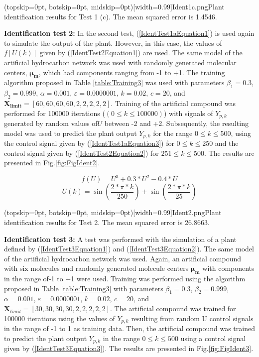 \documentclass{ieeeaccess}
\begin{document}
\Figure[ht!](topskip=0pt, botskip=0pt, midskip=0pt)[width=0.99\columnwidth]{Ident1c.png}{Plant identification results for Test 1 (c). The mean squared error is 1.4546\label{fig:FigIdent1c}.}

\textbf{Identification test 2:} In the second test, (\ref{IdentTest1aEquation1}) is used again to simulate the output of the plant. However, in this case, the values of \(f[U(k)]\) given by (\ref{IdentTest2Equation1})\cite{narendra_identification_1990} are used. The same model of the artificial hydrocarbon network was used with randomly generated molecular centers, \(\mathbf{\mu_m}\), which had components ranging from -1 to +1. The training algorithm proposed in Table \ref{table:Training3} was used with parameters \(\beta_1=0.3\), \(\beta_2=0.999\), \(\alpha=0.001\), \(\varepsilon=0.0000001\), \(k=0.02\), \(c=20\), and \(\mathbf{X_{limit}}=[60,60,60,60,2,2,2,2,2]\). Training of the artificial compound was performed for 100000 iterations (\((0\le k\le100000)\)) with signals of \(Y_{p,k}\) generated by random values of\(U\) between -2 and +2. Subsequently, the resulting model was used to predict the plant output \(Y_{p,k}\) for the range \(0\le k\le500\), using the control signal given by (\ref{IdentTest1aEquation3}) for \(0\le k\le250\) and the control signal given by (\ref{IdentTest2Equation2}) for \(251\le k\le500\). The results are presented in Fig.\ref{fig:FigIdent2}.

\begin{equation}\label{IdentTest2Equation1}
f\left(U\right)=U^3+0.3\ast U^2-0.4\ast U
\end{equation}
\begin{equation}\label{IdentTest2Equation2}
U\left(k\right)=\sin{\left(\frac{2\ast\pi\ast k}{250}\right)}+\sin{\left(\frac{2\ast\pi\ast k}{25}\right)}
\end{equation}

\Figure[ht!](topskip=0pt, botskip=0pt, midskip=0pt)[width=0.99\columnwidth]{Ident2.png}{Plant identification results for Test 2. The mean squared error is 26.8663\label{fig:FigIdent2}.}

\textbf{Identification test 3:} A test was performed with the simulation of a plant defined by (\ref{IdentTest3Equation1}) and (\ref{IdentTest3Equation2})\cite{narendra_identification_1990}. The
same model of the artificial hydrocarbon network was used. Again, an artificial compound with six molecules and randomly generated molecule centers \(\mathbf{\mu_m}\) with components in the range of-1 to +1 were used. Training was performed using the algorithm proposed in Table \ref{table:Training3} with parameters \(\beta_1=0.3\), \(\beta_2=0.999\), \(\alpha=0.001\), \(\varepsilon=0.0000001\), \(k=0.02\), \(c=20\), and \(\mathbf{X}_{limit}=[30,30,30,30,2,2,2,2,2]\). The artificial compound was trained for 100000 iterations using the values of \(Y_{p,k}\) resulting from random U control signals in the range of -1 to 1 as training data. Then, the artificial compound was trained to predict the plant output \(Y_{p,k}\) in the range \(0\le k\le500\) using a control signal given by (\ref{IdentTest3Equation3}). The results are presented in Fig.\ref{fig:FigIdent3}.
\end{document}

